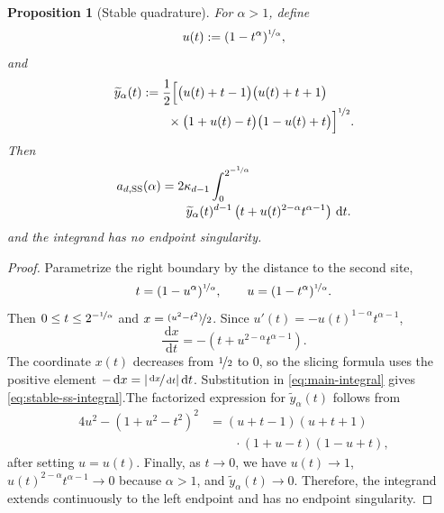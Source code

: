 \documentclass[a4paper,fleqn]{cas-dc}
\newtheorem{proposition}{Proposition}
\theoremstyle{definition}
\theoremstyle{remark}
\newcommand{\dd}{\,\mathrm{d}}
\newcommand{\0}{\mathbf{0}}
\begin{document}
\begin{proposition}[Stable quadrature]\label{prop:stable-quadrature}
For $\alpha>1$, define
\begin{equation}
u(t):=(1-t^\alpha)^{\nicefrac{1}{\alpha}},
\end{equation}
and
\begin{equation}
\begin{aligned}
\widetilde y_\alpha(t)
&:=\frac12\Bigl[
\bigl(u(t)+t-1\bigr)
\bigl(u(t)+t+1\bigr)
\\[-0.2em]
&\qquad{}\times
\bigl(1+u(t)-t\bigr)
\bigl(1-u(t)+t\bigr)
\Bigr]^{\nicefrac12}.
\end{aligned}
\end{equation}
Then
\begin{equation}\label{eq:stable-ss-integral}
\begin{split}
a_{d,\mathrm{SS}}(\alpha)
&=
2\kappa_{d-1}
\int_0^{2^{-\nicefrac{1}{\alpha}}}
\\[-0.2em]
&\qquad
\widetilde y_\alpha(t)^{d-1}
\left(
t+u(t)^{2-\alpha}t^{\alpha-1}
\right)
\dd t.
\end{split}
\end{equation}
and the integrand has no endpoint singularity.
\end{proposition}

\begin{proof}
Parametrize the right boundary by the distance to the second site,
\begin{equation}
t=(1-u^\alpha)^{\nicefrac{1}{\alpha}},
\qquad
u=(1-t^\alpha)^{\nicefrac{1}{\alpha}}.
\end{equation}
Then $0\leq t\leq2^{-\nicefrac{1}{\alpha}}$ and
$x=\nicefrac{(u^2-t^2)}{2}$. Since
$u'(t)=-u(t)^{1-\alpha}t^{\alpha-1}$,
\begin{equation}
\frac{\dd x}{\dd t}
=-
\left(t+u^{2-\alpha}t^{\alpha-1}\right).
\end{equation}
The coordinate $x(t)$ decreases from $\nicefrac{1}{2}$ to $0$, so the slicing formula
uses the positive element
$-\dd x=|\nicefrac{\dd x}{\dd t}|\dd t$. Substitution in \eqref{eq:main-integral}
gives \eqref{eq:stable-ss-integral}.The factorized expression for \(\widetilde y_\alpha(t)\) follows from
\begin{equation}
\begin{aligned}
4u^2-(1+u^2-t^2)^2
&=
(u+t-1)(u+t+1)
\\
&\qquad{}\cdot
(1+u-t)(1-u+t),
\end{aligned}
\end{equation}
after setting \(u=u(t)\). Finally, as \(t\to0\), we have
\(u(t)\to1\),
\(
u(t)^{2-\alpha}t^{\alpha-1}\to0
\)
because \(\alpha>1\), and
\(\widetilde y_\alpha(t)\to0\). Therefore, the integrand extends
continuously to the left endpoint and has no endpoint singularity.
\end{proof}
\end{document}
